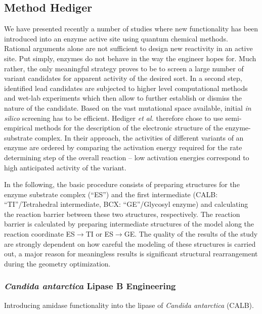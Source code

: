 \subsection{Method Hediger}
We have presented recently a number of studies where new functionality has been introduced into an enzyme active site using quantum chemical methods\cite{10.1371/journal.pone.0049849,hediger2013silico,hediger2013computational}.\\
Rational arguments alone are not sufficient to design new reactivity in an active site.
Put simply, enzymes do not behave in the way the engineer hopes for.
Much rather, the only meaningful strategy proves to be to screen a large number of variant candidates for apparent activity of the desired sort.
In a second step, identified lead candidates are subjected to higher level computational methods and wet-lab experiments which then allow to further establish or dismiss the nature of the candidate.
Based on the vast mutational space available, initial \textit{in silico} screening has to be efficient.
Hediger \textit{et al.} therefore chose to use semi-empirical methods for the description of the electronic structure of the enzyme-substrate complex.
In their approach, the activities of different variants of an enzyme are ordered by comparing the activation energy required for the rate determining step of the overall reaction -- low activation energies correspond to high anticipated activity of the variant.

In the following, the basic procedure consists of preparing structures for the enzyme substrate complex (``ES'') and the first intermediate (CALB: ``TI''/Tetrahedral intermediate, BCX: ``GE''/Glycosyl enzyme) and calculating the reaction barrier between these two structures, respectively.
The reaction barrier is calculated by preparing intermediate structures of the model along the reaction coordinate ES$\rightarrow$TI or ES$\rightarrow$GE.
The quality of the results of the study are strongly dependent on how careful the modeling of these structures is carried out, a major reason for meaningless results is significant structural rearrangement during the geometry optimization.

\subsubsection{{\textit{Candida antarctica} Lipase B Engineering}}
Introducing amidase functionality into the lipase of \textit{Candida antarctica} (CALB).

